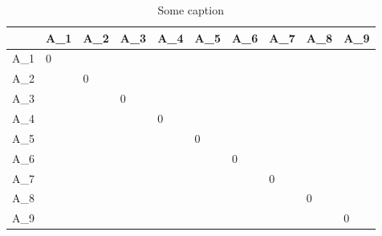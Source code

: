 \documentclass{article}
\begin{document}
\begin{table}%
	\centering
	\begin{tabular}{M|MMMMMMMMM}
		    & A_1 & A_2 & A_3 & A_4 & A_5 & A_6 & A_7 & A_8 & A_9 \\\hline
		A_1 & 0   &     &     &     &     &     &     &     &     \\
		A_2 &     & 0   &     &     &     &     &     &     &     \\
		A_3 &     &     & 0   &     &     &     &     &     &     \\
		A_4 &     &     &     & 0   &     &     &     &     &     \\
		A_5 &     &     &     &     & 0   &     &     &     &     \\
		A_6 &     &     &     &     &     & 0   &     &     &     \\
		A_7 &     &     &     &     &     &     & 0   &     &     \\
		A_8 &     &     &     &     &     &     &     & 0   &     \\
		A_9 &     &     &     &     &     &     &     &     & 0   \\
	\end{tabular}
	\caption{Some caption}
	\label{table:mytable}
\end{table}
\end{document}
